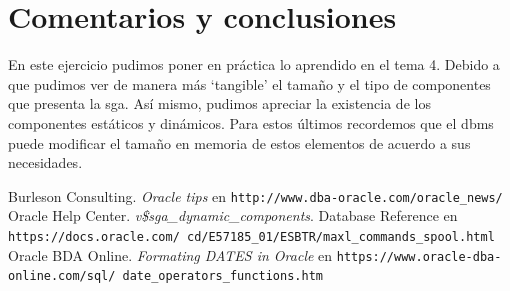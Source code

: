 \documentclass{article}
\begin{document}
\section*{Comentarios y conclusiones}

En este ejercicio pudimos poner en práctica lo aprendido en el tema 4. Debido a 
que pudimos ver de manera más `tangible' el tamaño y el tipo de componentes
que presenta la sga. Así mismo, pudimos apreciar la existencia de los 
componentes estáticos y dinámicos. Para estos últimos recordemos que el dbms
puede modificar el tamaño en memoria de estos elementos de acuerdo a sus 
necesidades. 

\renewcommand\refname{Bibliografía y referencias}
\begin{thebibliography}{99}
     Burleson Consulting. \textit{Oracle tips } en 
    \texttt{http://www.dba-oracle.com/oracle\_news/}
     Oracle Help Center. \textit{v\$sga\_dynamic\_components}. 
    Database Reference en 
    \texttt{https://docs.oracle.com/
    cd/E57185\_01/ESBTR/maxl\_commands\_spool.html}
     Oracle BDA Online. \textit{Formating DATES in Oracle} en 
    \texttt{https://www.oracle-dba-online.com/sql/
    date\_operators\_functions.htm}
\end{thebibliography}
\end{document}
